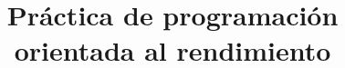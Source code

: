 

\title{Práctica de programación orientada al rendimiento}



\maketitle

\pagestyle{fancyplain}




